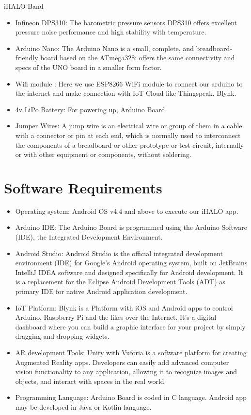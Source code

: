 iHALO Band
\begin{itemize}
	\item  Infineon DPS310: The barometric pressure sensors DPS310 offers excellent pressure noise performance and high stability with temperature.
	\item  Arduino Nano: The Arduino Nano is a small, complete, and breadboard-friendly board based on the ATmega328; offers the same connectivity and specs of the UNO board in a smaller form factor.
	\item  Wifi module : Here we use ESP8266 WiFi module to connect our arduino to the internet and make connection with IoT Cloud like Thingspeak, Blynk.
	\item 4v LiPo Battery: For powering up, Arduino Board.
	\item  Jumper Wires: A jump wire is an electrical wire or group of them in a cable with a connector or pin at each end, which is normally used to interconnect the components of a breadboard or other prototype or test circuit, internally or with other equipment or components, without soldering.
	\newpage
\end{itemize}


\section{Software Requirements}
\begin{itemize}
	\item  Operating system: Android OS v4.4 and above to execute our iHALO app.
	\item  Arduino IDE: The Arduino Board is programmed using the Arduino Software (IDE), the Integrated Development Environment.
	\item  Android Studio: Android Studio is the official integrated development environment (IDE) for Google's Android operating system, built on JetBrains IntelliJ IDEA software and designed specifically for Android development. It is a replacement for the Eclipse Android Development Tools (ADT) as primary IDE for native Android application development.
	\item  IoT Platform: Blynk is a Platform with iOS and Android apps to control Arduino, Raspberry Pi and the likes over the Internet. It's a digital dashboard where you can build a graphic interface for your project by simply dragging and dropping widgets.
	\item  AR development Tools: Unity with Vuforia is a software platform for creating Augmented Reality apps. Developers can easily add advanced computer vision functionality to any application, allowing it to recognize images and objects, and interact with spaces in the real world.
	\item  Programming Language: Arduino Board is coded in C language. Android app may be developed in Java or Kotlin language.
\end{itemize}
